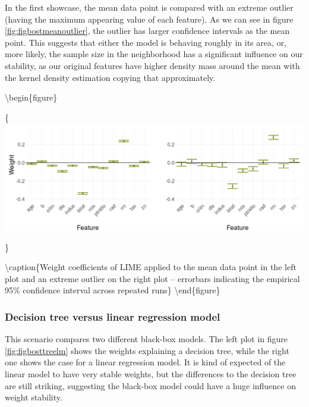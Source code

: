 \documentclass[
]{krantz}
\begin{document}
In the first showcase, the mean data point is compared with an extreme outlier (having the maximum appearing value of each feature).
As we can see in figure \ref{fig:figbostmeanoutlier}, the outlier has larger confidence intervals as the mean point.
This suggests that either the model is behaving roughly in its area, or, more likely, the sample size in the neighborhood has a significant influence on our stability, as our original features have higher density mass around the mean with the kernel density estimation copying that approximately.

\textbackslash begin\{figure\}

\{\centering \includegraphics[width=19.44in]{images/boston_meanVSmax}

\}

\textbackslash caption\{Weight coefficients of LIME applied to the mean data point in the left plot and an extreme outlier on the right plot -- errorbars indicating the empirical 95\% confidence interval across repeated runs\}\label{fig:figbostmeanoutlier}
\textbackslash end\{figure\}

\hypertarget{decision-tree-versus-linear-regression-model}{%
\subsubsection{Decision tree versus linear regression model}\label{decision-tree-versus-linear-regression-model}}

This scenario compares two different black-box models.
The left plot in figure \ref{fig:figbosttreelm} shows the weights explaining a decision tree, while the right one shows the case for a linear regression model.
It is kind of expected of the linear model to have very stable weights, but the differences to the decision tree are still striking, suggesting the black-box model could have a huge influence on weight stability.
\end{document}
